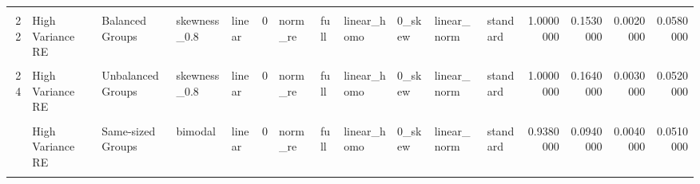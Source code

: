 \documentclass[12pt]{article}
\begin{document}
\begin{table}
{\begin{tabular}[t]{rllllrllllllrrrr}
\cellcolor{gray!6}{21} & \cellcolor{gray!6}{High Variance Error} & \cellcolor{gray!6}{Balanced Groups} & \cellcolor{gray!6}{skewness\_0.8} & \cellcolor{gray!6}{linear} & \cellcolor{gray!6}{0} & \cellcolor{gray!6}{norm\_re} & \cellcolor{gray!6}{full} & \cellcolor{gray!6}{linear\_homo} & \cellcolor{gray!6}{0\_skew} & \cellcolor{gray!6}{linear\_norm} & \cellcolor{gray!6}{standard} & \cellcolor{gray!6}{1.0000000} & \cellcolor{gray!6}{0.5130000} & \cellcolor{gray!6}{0.0910000} & \cellcolor{gray!6}{0.0530000}\\
22 & High Variance RE & Balanced Groups & skewness\_0.8 & linear & 0 & norm\_re & full & linear\_homo & 0\_skew & linear\_norm & standard & 1.0000000 & 0.1530000 & 0.0020000 & 0.0580000\\
\cellcolor{gray!6}{23} & \cellcolor{gray!6}{High Variance Error} & \cellcolor{gray!6}{Unbalanced Groups} & \cellcolor{gray!6}{skewness\_0.8} & \cellcolor{gray!6}{linear} & \cellcolor{gray!6}{0} & \cellcolor{gray!6}{norm\_re} & \cellcolor{gray!6}{full} & \cellcolor{gray!6}{linear\_homo} & \cellcolor{gray!6}{0\_skew} & \cellcolor{gray!6}{linear\_norm} & \cellcolor{gray!6}{standard} & \cellcolor{gray!6}{1.0000000} & \cellcolor{gray!6}{0.4640000} & \cellcolor{gray!6}{0.0710000} & \cellcolor{gray!6}{0.0590000}\\
24 & High Variance RE & Unbalanced Groups & skewness\_0.8 & linear & 0 & norm\_re & full & linear\_homo & 0\_skew & linear\_norm & standard & 1.0000000 & 0.1640000 & 0.0030000 & 0.0520000\\
\cellcolor{gray!6}{25} & \cellcolor{gray!6}{High Variance Error} & \cellcolor{gray!6}{Same-sized Groups} & \cellcolor{gray!6}{bimodal} & \cellcolor{gray!6}{linear} & \cellcolor{gray!6}{0} & \cellcolor{gray!6}{norm\_re} & \cellcolor{gray!6}{full} & \cellcolor{gray!6}{linear\_homo} & \cellcolor{gray!6}{0\_skew} & \cellcolor{gray!6}{linear\_norm} & \cellcolor{gray!6}{standard} & \cellcolor{gray!6}{0.0440000} & \cellcolor{gray!6}{0.1050000} & \cellcolor{gray!6}{0.0950000} & \cellcolor{gray!6}{0.0380000}\\
\addlinespace
26 & High Variance RE & Same-sized Groups & bimodal & linear & 0 & norm\_re & full & linear\_homo & 0\_skew & linear\_norm & standard & 0.9380000 & 0.0940000 & 0.0040000 & 0.0510000\\
\cellcolor{gray!6}{27} & \cellcolor{gray!6}{High Variance Error} & \cellcolor{gray!6}{Balanced Groups} & \cellcolor{gray!6}{bimodal} & \cellcolor{gray!6}{linear} & \cellcolor{gray!6}{0} & \cellcolor{gray!6}{norm\_re} & \cellcolor{gray!6}{full} & \cellcolor{gray!6}{linear\_homo} & \cellcolor{gray!6}{0\_skew} & \cellcolor{gray!6}{linear\_norm} & \cellcolor{gray!6}{standard} & \cellcolor{gray!6}{0.0490000} & \cellcolor{gray!6}{0.1150000} & \cellcolor{gray!6}{0.1130000} & \cellcolor{gray!6}{0.0440000}\\

\end{tabular}}
\end{table}
\end{document}
